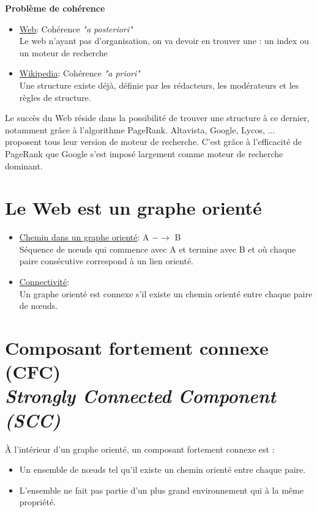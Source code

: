 \textbf{Problème de cohérence}

\begin{itemize}
\item \underline{Web}: Cohérence \textit{"a posteriori"} 
						\vspace{0.1cm}
                       \\ Le web n'ayant pas d'organisation, on va devoir en trouver une : un index ou un moteur de recherche
      
\item \underline{Wikipedia}: Cohérence \textit{"a priori"}
							\vspace{0.1cm}
                             \\ Une structure existe déjà, définie par les rédacteurs, les modérateurs et les règles de structure.
\end{itemize}

Le succès du Web réside dans la possibilité de trouver une structure à ce dernier, notamment grâce à l'algorithme PageRank. Altavista, Google, Lycos, ... proposent tous leur version de moteur de recherche. C'est grâce à l'efficacité de PageRank que Google s'est imposé largement comme moteur de recherche dominant.

\section{Le Web est un graphe orienté}
\begin{itemize}
\item \underline{Chemin dans un graphe orienté}: A $- \rightarrow$ B
\vspace{0.1cm}
\\Séquence de nœuds qui commence avec A et termine avec B et où chaque paire consécutive correspond à un lien orienté.

\item \underline{Connectivité}: 
\vspace{0.1cm}
\\Un graphe orienté est connexe s'il existe un chemin orienté entre chaque paire de nœuds.
\end{itemize}

\section{Composant fortement connexe (CFC) \\ \textit{Strongly Connected Component (SCC)} }

À l'intérieur d'un graphe orienté, un composant fortement connexe est :
\begin{itemize}
    \item Un ensemble de nœuds tel qu'il existe un chemin orienté entre                   chaque paire.
    \item L'ensemble ne fait pas partie d'un plus grand environnement qui               à la même propriété. 
\end{itemize}

